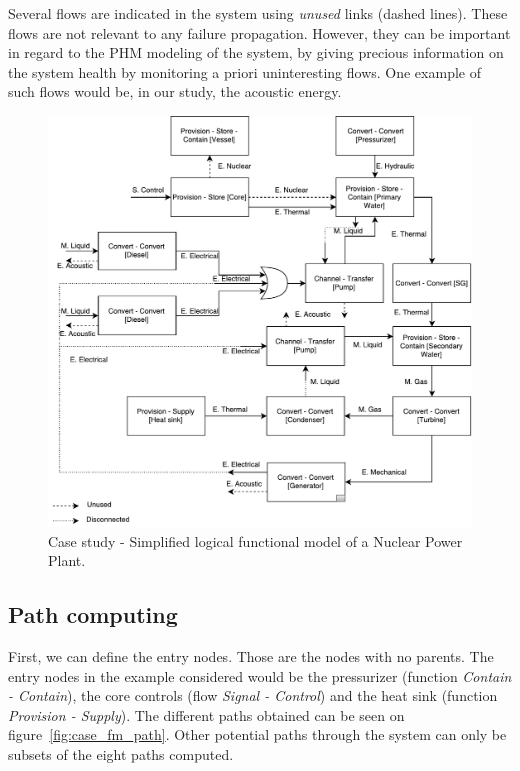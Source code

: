 Several flows are indicated in the system using \textit{unused} links (dashed lines). These flows are not relevant to any failure propagation. However, they can be important in regard to the PHM modeling of the system, by giving precious information on the system health by monitoring a priori uninteresting flows. One example of such flows would be, in our study, the acoustic energy.

\begin{figure}[t]
\centering
\includegraphics[scale=.65]{fig/Function_model}
\caption{Case study - Simplified logical functional model of a Nuclear Power Plant.}
\label{fig:case_fm}
\end{figure}

\subsection{Path computing}

First, we can define the entry nodes. Those are the nodes with no parents. The entry nodes in the example considered would be the pressurizer (function \textit{Contain - Contain}), the core controls (flow \textit{Signal - Control}) and the heat sink (function \textit{Provision - Supply}). The different paths obtained can be seen on figure~\ref{fig:case_fm_path}. Other potential paths through the system can only be subsets of the eight paths computed.

